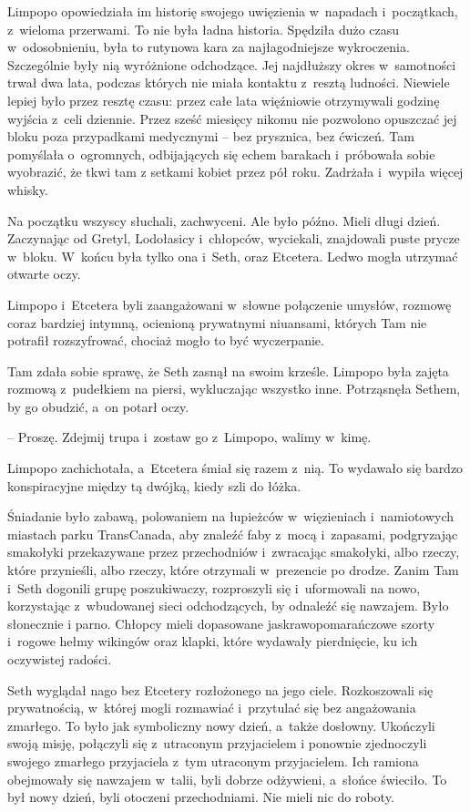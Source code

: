 \documentclass[oneside,polish,11pt,sfheadings]{mwbk}
\begin{document}
Limpopo opowiedziała im historię swojego uwięzienia w~napadach i~początkach, z~wieloma przerwami. To nie była ładna historia. Spędziła
dużo czasu w~odosobnieniu, była to rutynowa kara za najłagodniejsze
wykroczenia. Szczególnie były nią wyróżnione odchodzące. Jej najdłuższy
okres w~samotności trwał dwa lata, podczas których nie miała kontaktu z~resztą ludności. Niewiele lepiej było przez resztę czasu: przez całe
lata więźniowie otrzymywali godzinę wyjścia z~celi dziennie. Przez sześć
miesięcy nikomu nie pozwolono opuszczać jej bloku poza przypadkami
medycznymi -- bez prysznica, bez ćwiczeń. Tam pomyślała o~ogromnych,
odbijających się echem barakach i~próbowała sobie wyobrazić, że tkwi tam
z setkami kobiet przez pół roku. Zadrżała i~wypiła więcej whisky.

Na początku wszyscy słuchali, zachwyceni. Ale było późno. Mieli długi
dzień. Zaczynając od Gretyl, Lodołasicy i~chłopców, wyciekali,
znajdowali puste prycze w~bloku. W~końcu była tylko ona i~Seth, oraz
Etcetera. Ledwo mogła utrzymać otwarte oczy.

Limpopo i~Etcetera byli zaangażowani w~słowne połączenie umysłów,
rozmowę coraz bardziej intymną, ocienioną prywatnymi niuansami, których
Tam nie potrafił rozszyfrować, chociaż mogło to być wyczerpanie.

Tam zdała sobie sprawę, że Seth zasnął na swoim krześle. Limpopo była
zajęta rozmową z~pudełkiem na piersi, wykluczając wszystko inne.
Potrząsnęła Sethem, by go obudzić, a~on potarł oczy. 

-- Proszę. Zdejmij
trupa i~zostaw go z~Limpopo, walimy w~kimę.

Limpopo zachichotała, a~Etcetera śmiał się razem z~nią. To wydawało się
bardzo konspiracyjne między tą dwójką, kiedy szli do łóżka.

Śniadanie było zabawą, polowaniem na łupieżców w~więzieniach i~namiotowych miastach parku TransCanada, aby znaleźć faby z~mocą i~zapasami, podgryzając smakołyki przekazywane przez przechodniów i~zwracając smakołyki, albo rzeczy, które przynieśli, albo rzeczy, które
otrzymali w~prezencie po drodze. Zanim Tam i~Seth dogonili grupę
poszukiwaczy, rozproszyli się i~uformowali na nowo, korzystając z~wbudowanej sieci odchodzących, by odnaleźć się nawzajem. Było słonecznie
i parno. Chłopcy mieli dopasowane jaskrawopomarańczowe szorty i~rogowe
hełmy wikingów oraz klapki, które wydawały pierdnięcie, ku ich
oczywistej radości.

Seth wyglądał nago bez Etcetery rozłożonego na jego ciele. Rozkoszowali
się prywatnością, w~której mogli rozmawiać i~przytulać się bez
angażowania zmarłego. To było jak symboliczny nowy dzień, a~także
dosłowny. Ukończyli swoją misję, połączyli się z~utraconym przyjacielem
i ponownie zjednoczyli swojego zmarłego przyjaciela z~tym utraconym
przyjacielem. Ich ramiona obejmowały się nawzajem w~talii, byli dobrze
odżywieni, a~słońce świeciło. To był nowy dzień, byli otoczeni
przechodniami. Nie mieli nic do roboty.
\end{document}
